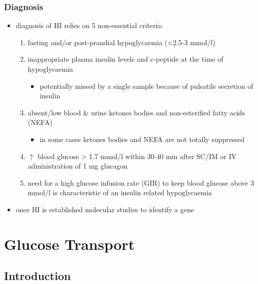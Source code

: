 \documentclass{scrartcl}
\begin{document}
\subsubsection{Diagnosis}
\label{sec:org05b2240}
\begin{itemize}
\item diagnosis of HI relies on 5 non-essential criteria:
\begin{enumerate}
\item fasting and/or post-prandial hypoglycaemia (<2.5-3 mmol/l)
\item inappropriate plasma insulin levels and c-peptide at the time of
hypoglycaemia
\begin{itemize}
\item potentially missed by a single sample because of pulsatile
secretion of insulin
\end{itemize}
\item absent/low blood \& urine ketones bodies and non-esterified fatty
acids (NEFA)
\begin{itemize}
\item in some cases ketones bodies and NEFA are not totally
suppressed
\end{itemize}
\item \(\uparrow\) blood glucose \textgreater{} 1.7 mmol/l within 30-40 min after
SC/IM or IV administration of 1 mg glucagon
\item need for a high glucose infusion rate (GIR) to keep blood
glucose above 3 mmol/l is characteristic of an insulin related
hypoglycaemia
\end{enumerate}

\item once HI is established molecular studies to identify a gene
\end{itemize}

\section{Glucose Transport}
\label{sec:orgbb793b4}
\subsection{Introduction}
\label{sec:org04ace91}
\end{document}
